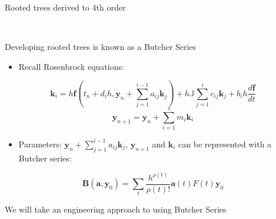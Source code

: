\documentclass[serif]{beamer}
\begin{document}
\begin{frame}{Rooted trees derived to 4th order}
\begin{center}
{} \\ \vspace{1cm}
\end{center}
\end{frame}

\begin{frame}{Developing rooted trees is known as a Butcher Series}
  \begin{itemize}
    \item<1-> Recall Rosenbrock equations:
  \end{itemize}
  \begin{equation}
    \nonumber \mathbf{k}_{i} = h\mathbf{f} \left(t_n + d_ih,\mathbf{y}_n + \sum_{j=1}^{i-1}a_{ij}\mathbf{k}_{j}\right) 
                                + h\mathbb{J}\sum_{j=1}^i c_{ij}\mathbf{k}_{j}  + b_ih\frac{d\mathbf{f}}{dt}
  \end{equation}
  \begin{equation}
    \nonumber \mathbf{y}_{n+1} = \mathbf{y}_{n} + \sum_{i=1}^s m_i\mathbf{k}_i
  \end{equation}
  \begin{itemize}
  \item<1->  Parameters: $\mathbf{y}_n + \sum_{j=1}^{i-1}a_{ij}\mathbf{k}_{j}$, $\mathbf{y}_{n+1}$ and $\mathbf{k}_i$ can be represented with a Butcher series:
  \end{itemize}
  \begin{equation}
    \nonumber
    \mathbf{B}\left(\mathbf{a}, \mathbf{y}_0\right) = \sum_t \frac{h^{\rho\left(t\right)}}{\rho\left(t\right)!}\mathbf{a}\left(t\right)F\left(t\right)\mathbf{y}_0
  \end{equation}
  \begin{center}
    \alert{We will take an engineering approach to using Butcher Series}
  \end{center}
\end{frame}
\end{document}
